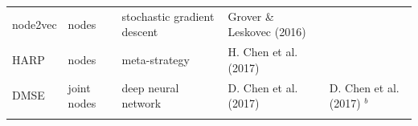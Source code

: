 \documentclass[11pt]{article}
\begin{document}
\begin{longtable}[]{@{}lllll@{}}
\begin{minipage}[t]{0.09\columnwidth}\raggedright
node2vec\strut
\end{minipage} & \begin{minipage}[t]{0.11\columnwidth}\raggedright
nodes\strut
\end{minipage} & \begin{minipage}[t]{0.23\columnwidth}\raggedright
stochastic gradient descent\strut
\end{minipage} & \begin{minipage}[t]{0.14\columnwidth}\raggedright
Grover \& Leskovec (2016)\strut
\end{minipage} & \begin{minipage}[t]{0.29\columnwidth}\raggedright
\strut
\end{minipage}\tabularnewline
\begin{minipage}[t]{0.09\columnwidth}\raggedright
HARP\strut
\end{minipage} & \begin{minipage}[t]{0.11\columnwidth}\raggedright
nodes\strut
\end{minipage} & \begin{minipage}[t]{0.23\columnwidth}\raggedright
meta-strategy\strut
\end{minipage} & \begin{minipage}[t]{0.14\columnwidth}\raggedright
H. Chen et al. (2017)\strut
\end{minipage} & \begin{minipage}[t]{0.29\columnwidth}\raggedright
\strut
\end{minipage}\tabularnewline
\begin{minipage}[t]{0.09\columnwidth}\raggedright
DMSE\strut
\end{minipage} & \begin{minipage}[t]{0.11\columnwidth}\raggedright
joint nodes\strut
\end{minipage} & \begin{minipage}[t]{0.23\columnwidth}\raggedright
deep neural network\strut
\end{minipage} & \begin{minipage}[t]{0.14\columnwidth}\raggedright
D. Chen et al. (2017)\strut
\end{minipage} & \begin{minipage}[t]{0.29\columnwidth}\raggedright
D. Chen et al. (2017) \(^b\)\strut
\end{minipage}\tabularnewline
\begin{minipage}[t]{0.09\columnwidth}\raggedright

\end{minipage}
\end{longtable}
\end{document}
